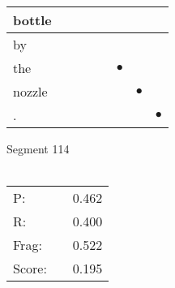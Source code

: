 \documentclass[landscape]{article}
\newcommand{\ssp}{\hspace{2pt}}
\newcommand{\mex}{\cellcolor{g}$\bullet$}
\begin{document}
\begin{tabular}{|l|p{10pt}|p{10pt}|p{10pt}|p{10pt}|p{10pt}|p{10pt}|p{10pt}|}
\hline
\ssp bottle \ssp&\hspace{2pt}&\hspace{2pt}&\hspace{2pt}&\hspace{2pt}&\hspace{2pt}&\hspace{2pt}&\hspace{2pt}\\
\hline
\ssp by \ssp&\hspace{2pt}&\hspace{2pt}&\hspace{2pt}&\hspace{2pt}&\hspace{2pt}&\hspace{2pt}&\hspace{2pt}\\
\hline
\ssp \cellcolor{ref4}the \ssp&\hspace{2pt}&\hspace{2pt}&\hspace{2pt}&\hspace{2pt}&\hspace{2pt}\mex&\hspace{2pt}&\hspace{2pt}\\
\hline
\ssp \cellcolor{ref5}nozzle \ssp&\hspace{2pt}&\hspace{2pt}&\hspace{2pt}&\hspace{2pt}&\hspace{2pt}&\hspace{2pt}\mex&\hspace{2pt}\\
\hline
\ssp \cellcolor{ref6}. \ssp&\hspace{2pt}&\hspace{2pt}&\hspace{2pt}&\hspace{2pt}&\hspace{2pt}&\hspace{2pt}&\hspace{2pt}\mex\\
\hline
\end{tabular}

\vspace{6pt}
\noindent Segment 114\\\\
\noindent\begin{tabular}{lm{12pt}r}
\hline
P:&&0.462\\
R:&&0.400\\
Frag:&&0.522\\
Score:&&0.195\\
\end{tabular}
\end{document}
